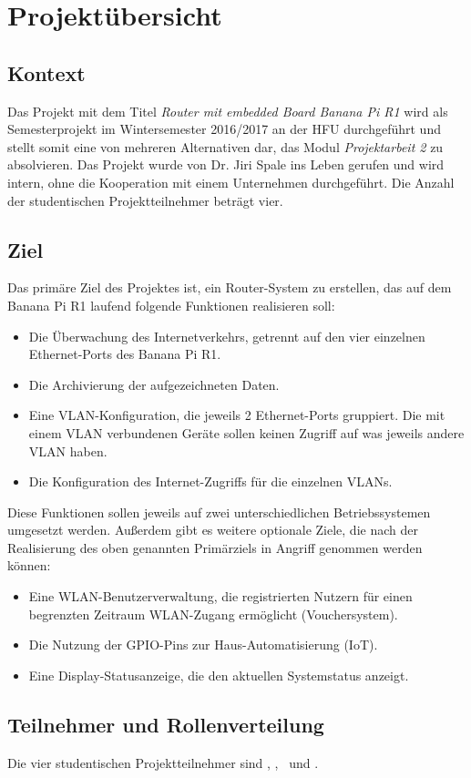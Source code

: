 \chapter{Projektübersicht}

\section{Kontext}
Das Projekt mit dem Titel \textit{Router mit embedded Board Banana Pi R1} wird als Semesterprojekt im Wintersemester 2016/2017 an der \ac{HFU} durchgeführt und stellt somit eine von mehreren Alternativen dar, das Modul  \textit{Projektarbeit 2} zu absolvieren. Das Projekt wurde von Dr. Jiri Spale ins Leben gerufen und wird intern, ohne die Kooperation mit einem Unternehmen durchgeführt. Die Anzahl der studentischen Projektteilnehmer beträgt vier.

\section{Ziel}
Das primäre Ziel des Projektes ist, ein Router-System zu erstellen, das auf dem Banana Pi R1 laufend folgende Funktionen realisieren soll:
\begin{itemize}
	\item Die Überwachung des Internetverkehrs, getrennt auf den vier einzelnen Ethernet-Ports des Banana Pi R1.
	\item Die Archivierung der aufgezeichneten Daten.
	\item Eine \ac{VLAN}-Konfiguration, die jeweils 2 Ethernet-Ports gruppiert. Die mit einem \ac{VLAN} verbundenen Geräte sollen keinen Zugriff auf was jeweils andere \ac{VLAN} haben.
	\item Die Konfiguration des Internet-Zugriffs für die einzelnen \ac{VLAN}s.
\end{itemize}
Diese Funktionen sollen jeweils auf zwei unterschiedlichen Betriebssystemen umgesetzt werden. Außerdem gibt es weitere optionale Ziele, die nach der Realisierung des oben genannten Primärziels in Angriff genommen werden können:
\begin{itemize}
	\item Eine WLAN-Benutzerverwaltung, die registrierten Nutzern für einen begrenzten Zeitraum WLAN-Zugang ermöglicht (Vouchersystem).
	\item Die Nutzung der GPIO-Pins zur Haus-Automatisierung (\ac{IoT}).
	\item Eine Display-Statusanzeige, die den aktuellen Systemstatus anzeigt.
\end{itemize}

\section{Teilnehmer und Rollenverteilung}
Die vier studentischen Projektteilnehmer sind \docJakoby, \docKlemm, \docMeyer~und \docMichalowski.
